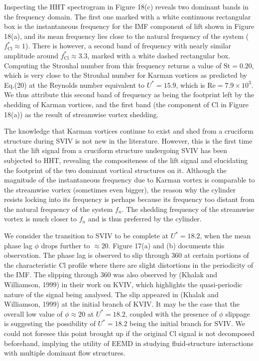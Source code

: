 \documentclass[]{article}
\begin{document}
Inspecting the HHT spectrogram in Figure 18(c) reveals two dominant
bands in the frequency domain. The first one marked with a white
continuous rectangular box is the instantaneous frequency for the IMF
component of lift shown in Figure 18(a), and its mean frequency lies
close to the natural frequency of the system
(\(f_{\text{Cl}}^{*} \approx 1\)). There is however, a second band of
frequency with nearly similar amplitude around
\(f_{\text{Cl}}^{*} \approx 3.3\), marked with a white dashed
rectangular box. Computing the Strouhal number from this frequency
returns a value of \(\text{St} = 0.20\), which is very close to the
Strouhal number for Karman vortices as predicted by Eq.(20) at the
Reynolds number equivalent to \(U^{*} = 15.9\), which is
\(\text{Re} = 7.9 \times 10^{3}\). We thus attribute this second band of
frequency as being the footprint left by the shedding of Karman
vortices, and the first band (the component of Cl in Figure 18(a)) as
the result of streamwise vortex shedding.

The knowledge that Karman vortices continue to exist and shed from a
cruciform structure during SVIV is not new in the literature. However,
this is the first time that the lift signal from a cruciform structure
undergoing SVIV has been subjected to HHT, revealing the compositeness
of the lift signal and elucidating the footprint of the two dominant
vortical structures on it. Although the magnitude of the instantaneous
frequency due to Karman vortex is comparable to the streamwise vortex
(sometimes even bigger), the reason why the cylinder resists locking
into its frequency is perhaps because its frequency too distant from the
natural frequency of the system \(f_{n}\). The shedding frequency of the
streamwise vortex is much closer to \(f_{n}\) and is thus preferred by
the cylinder.

We consider the transition to SVIV to be complete at \(U^{*} = 18.2\),
when the mean phase lag \(\phi\) drops further to \(\approx 20\). Figure
17(a) and (b) documents this observation. The phase lag is observed to
slip through \(360\) at certain portions of the characteristic Cl
profile where there are slight distortions in the periodicity of the
IMF. The slipping through \(360\) was also observed by (Khalak and
Williamson, 1999) in their work on KVIV, which highlights the
quasi-periodic nature of the signal being analysed. The slip appeared in
(Khalak and Williamson, 1999) at the initial branch of KVIV. It may be
the case that the overall low value of \(\phi \approx 20\) at
\(U^{*} = 18.2\), coupled with the presence of \(\phi\) slippage is
suggesting the possibility of \(U^{*} = 18.2\) being the initial branch
for SVIV. We could not foresee this point brought up if the original Cl
signal is not decomposed beforehand, implying the utility of EEMD in
studying fluid-structure interactions with multiple dominant flow
structures.
\end{document}
